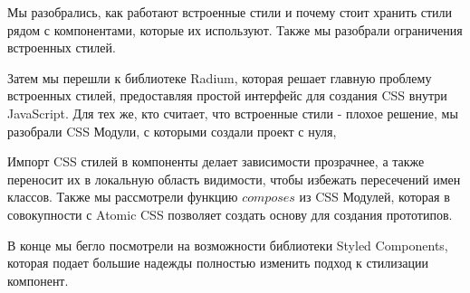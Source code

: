 Мы разобрались, как работают встроенные стили и почему стоит хранить стили рядом с компонентами, которые их используют. Также мы разобрали ограничения встроенных стилей.

Затем мы перешли к библиотеке Radium, которая решает главную проблему встроенных стилей, предоставляя простой интерфейс для создания CSS внутри JavaScript. Для тех же, кто считает, что встроенные стили - плохое решение, мы разобрали CSS Модули, с которыми создали проект с нуля,

Импорт CSS стилей в компоненты делает зависимости прозрачнее, а также переносит их в локальную область видимости, чтобы избежать пересечений имен классов. Также мы рассмотрели функцию $composes$ из CSS Модулей, которая в совокупности с Atomic CSS позволяет создать основу для создания прототипов.

В конце мы бегло посмотрели на возможности библиотеки Styled Components, которая подает большие надежды полностью изменить подход к стилизации компонент.













